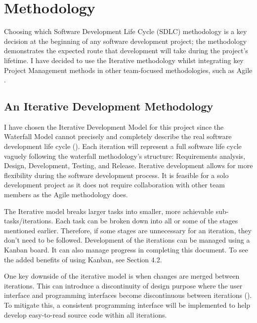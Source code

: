 \chapter{Methodology}
\label{chap:methodology}

Choosing which Software Development Life Cycle (SDLC) methodology is a key decision at the beginning of any software development project; the methodology demonstrates the expected route that development will take during the project's lifetime. I have decided to use the Iterative methodology whilst integrating key Project Management methods in other team-focused methodologies, such as Agile .

\section{An Iterative Development Methodology}
\label{methodology:chosen}

I have chosen the Iterative Development Model for this project since the Waterfall Model cannot precisely and completely describe the real software development life cycle (\cite{dapeng_liu_case_2011}).
Each iteration will represent a full software life cycle vaguely following the waterfall methodology's structure: Requirements analysis, Design, Development, Testing, and Release. Iterative development allows for more flexibility during the software development process. It is feasible for a solo development project as it does not require collaboration with other team members as the Agile methodology does.

The Iterative model breaks larger tasks into smaller, more achievable sub-tasks/iterations. Each task can be broken down into all or some of the stages mentioned earlier. Therefore, if some stages are unnecessary for an iteration, they don't need to be followed. Development of the iterations can be managed using a Kanban board. It can also manage progress in completing this document. To see the added benefits of using Kanban, see Section 4.2.

One key downside of the iterative model is when changes are merged between iterations. This can introduce a discontinuity of design purpose where the user interface and programming interfaces become discontinuous between iterations (\cite{dapeng_liu_case_2011}). To mitigate this, a consistent programming interface will be implemented to help develop easy-to-read source code within all iterations.